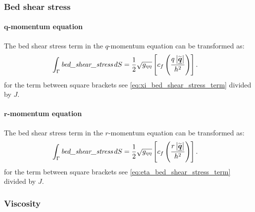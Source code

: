 \subsubsection{Bed shear stress}
\paragraph*{$\bm q$-momentum equation}
The bed shear stress term in the $q$-momentum equation can be transformed as:
\begin{align}
    \int_\Gamma \textit{bed\_shear\_stress} \, dS &= \frac{1}{2} \sqrt{g_{\eta\eta}} \left[ c_f \left( \frac{q\left\lvert \widetilde{\mbox{\boldmath $\underline{q}$}} \right\rvert}{h^2} \right) \right].
\end{align}
for the term between square brackets see \autoref{eq:xi_bed_shear_stress_term} divided by $J$.
\paragraph*{$\bm r$-momentum equation}
The bed shear stress term in the $r$-momentum equation can be transformed as:
\begin{align}
    \int_\Gamma \textit{bed\_shear\_stress} \, dS &= \frac{1}{2} \sqrt{g_{\eta\eta}} \left[ c_f \left( \frac{r\left\lvert \widetilde{\mbox{\boldmath $\underline{q}$}} \right\rvert}{h^2} \right) \right].
\end{align}
for the term between square brackets see \autoref{eq:eta_bed_shear_stress_term} divided by $J$.
\subsubsection{Viscosity}
